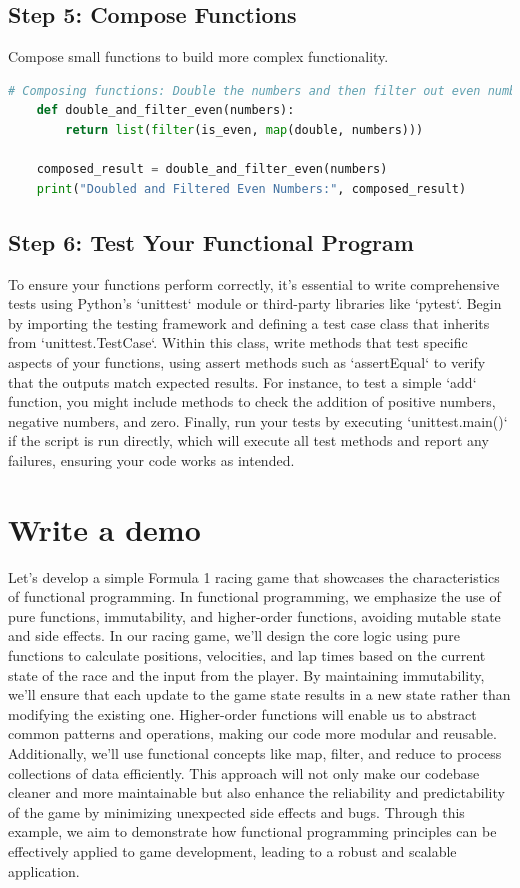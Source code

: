 \documentclass[12pt]{article}
\begin{document}
\subsection{Step 5: Compose Functions}
Compose small functions to build more complex functionality.
\begin{lstlisting}[language = Python]
    # Composing functions: Double the numbers and then filter out even numbers
    def double_and_filter_even(numbers):
        return list(filter(is_even, map(double, numbers)))
    
    composed_result = double_and_filter_even(numbers)
    print("Doubled and Filtered Even Numbers:", composed_result)
\end{lstlisting}
\subsection{Step 6: Test Your Functional Program}

To ensure your functions perform correctly, it's essential to write comprehensive tests using Python's `unittest` module or third-party libraries like `pytest`. Begin by importing the testing framework and defining a test case class that inherits from `unittest.TestCase`. Within this class, write methods that test specific aspects of your functions, using assert methods such as `assertEqual` to verify that the outputs match expected results. For instance, to test a simple `add` function, you might include methods to check the addition of positive numbers, negative numbers, and zero. Finally, run your tests by executing `unittest.main()` if the script is run directly, which will execute all test methods and report any failures, ensuring your code works as intended.

\section{Write a demo}
Let's develop a simple Formula 1 racing game that showcases the characteristics of functional programming. In functional programming, we emphasize the use of pure functions, immutability, and higher-order functions, avoiding mutable state and side effects. In our racing game, we'll design the core logic using pure functions to calculate positions, velocities, and lap times based on the current state of the race and the input from the player. By maintaining immutability, we'll ensure that each update to the game state results in a new state rather than modifying the existing one. Higher-order functions will enable us to abstract common patterns and operations, making our code more modular and reusable. Additionally, we'll use functional concepts like map, filter, and reduce to process collections of data efficiently. This approach will not only make our codebase cleaner and more maintainable but also enhance the reliability and predictability of the game by minimizing unexpected side effects and bugs. Through this example, we aim to demonstrate how functional programming principles can be effectively applied to game development, leading to a robust and scalable application.
\end{document}

